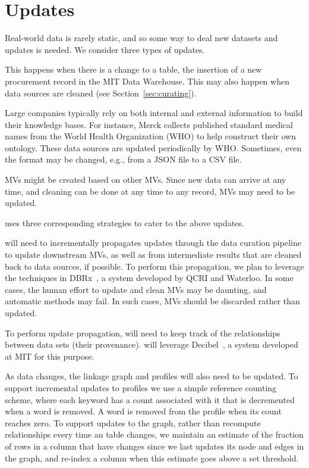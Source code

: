 \section{Updates}
\label{sec:updates}

Real-world data is rarely static, and so some way to deal new datasets and updates is needed. We consider three types of updates.

 This happens when there is a
change to a table, \eg the insertion of a new procurement record in the MIT Data
Warehouse. This may also happen when data sources are cleaned (see
Section~\ref{sec:curating}).


 Large companies typically rely on
both internal and external information to build their knowledge bases. For
instance, Merck collects published standard medical names from the World Health
Organization (WHO) to help construct their own ontology. These data sources are
updated periodically by WHO.  Sometimes, even the format may be changed, e.g.,
from a JSON file to a CSV file.


 MVs might be created based on other MVs.  Since
new data can arrive at any time, and cleaning can be done at any time to any record, MVs may need to be
updated.


\dcv uses three corresponding strategies to cater to the above updates.

 \dcv will need to incrementally propagates updates through the data curation pipeline to update downstream MVs, as well as from intermediate results that are cleaned back to data sources, if possible.
To perform this propagation, we plan to leverage the techniques in DBRx~\cite{DBLP:conf/sigmod/ChalamallaIOP14}, a system developed by QCRI and Waterloo.
In some cases, the human effort to update and clean MVs may be daunting, and automatic methods may fail. In such cases, MVs should be discarded rather than updated. 

  To perform update propagation, \dcv will need to keep track of the relationships between data sets (their provenance). \dcv will leverage Decibel~\cite{DBLP:journals/pvldb/MaddoxGEMPD16}, a system developed at MIT for this purpose.

  As data changes, the linkage graph and profiles will also need to be updated.  To support incremental updates  to profiles we  use a simple reference counting scheme, where each keyword has a count associated with it that is decremented when a word is removed.  A word
is removed from the profile when its count reaches zero.  To support updates to the graph, rather than recompute relationships every time an table changes, we 
maintain an estimate of the fraction of rows in a column that have changes since we last updates its node and edges in the graph, and re-index a column when
this estimate goes above a set threshold.


